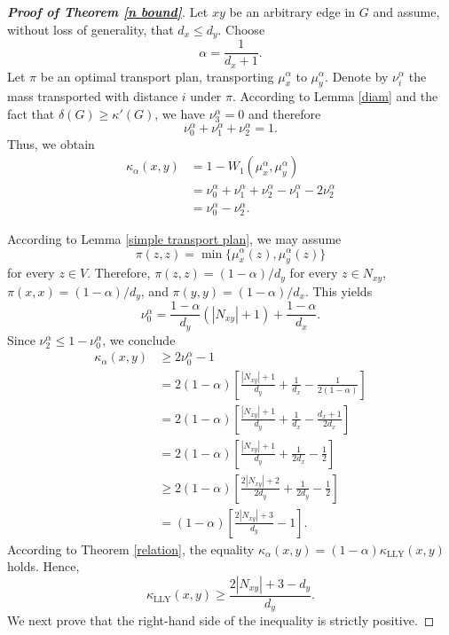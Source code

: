 \documentclass[11pt,bezier]{article}
\theoremstyle{definition}
\theoremstyle{definition}
\theoremstyle{nonumber}
\newtheorem*{theorem*}{Theorem}
\begin{document}

\begin{proof}[\bf{Proof of Theorem \ref{n bound}}]
Let $xy$ be an arbitrary edge in $G$ and assume, without loss of generality, that $d_x \leq d_y$. Choose
$$\alpha = \frac{1}{d_x + 1}.$$
Let $\pi$ be an optimal transport plan, transporting $\mu_x^\alpha$ to $\mu_y^\alpha$. Denote by $\nu_i^\alpha$ the mass transported with distance $i$ under $\pi$. According to Lemma \ref{diam} and the fact that $\delta(G)\geq \kappa'(G)$, we have $\nu_3^\alpha = 0$ and therefore
$$
\nu_0^\alpha + \nu_1^\alpha + \nu_2^\alpha = 1.
$$
Thus, we obtain
\begin{align*} 
\kappa_\alpha(x, y) &= 1 - W_1(\mu_x^\alpha, \mu_y^\alpha)\\
&= \nu_0^\alpha + \nu_1^\alpha + \nu_2^\alpha - \nu_1^\alpha - 2\nu_2^\alpha\\
&= \nu_0^\alpha - \nu_2^\alpha.
\end{align*}

According to Lemma \ref{simple transport plan}, we may assume
$$
\pi(z, z) = \min\{\mu_x^\alpha(z), \mu_y^\alpha(z)\}
$$
for every $z \in V$. Therefore, $\pi(z, z) = (1 - \alpha)/d_y$ for every $z \in N_{xy}$, $\pi(x, x) = (1 - \alpha)/d_y$, and $\pi(y, y) = (1 - \alpha)/d_x$. This yields
$$\nu_0^\alpha = \frac{1 - \alpha}{d_y} (|N_{xy}| + 1) + \frac{1 - \alpha}{d_x}.$$
Since $\nu_2^\alpha \leq 1 - \nu_0^\alpha$, we conclude
\begin{align*} 
\kappa_\alpha(x, y) &\geq 2\nu_0^\alpha - 1\\
&= 2(1 - \alpha) \left[ \frac{|N_{xy}| + 1}{d_y} + \frac{1}{d_x} - \frac{1}{2(1 - \alpha)} \right]\\
&= 2(1 - \alpha) \left[ \frac{|N_{xy}| + 1}{d_y} + \frac{1}{d_x} - \frac{d_x + 1}{2d_x} \right]\\
&= 2(1 - \alpha) \left[ \frac{|N_{xy}| + 1}{d_y} + \frac{1}{2d_x} - \frac{1}{2} \right]\\
&\geq 2(1 - \alpha) \left[ \frac{2|N_{xy}| + 2}{2d_y} + \frac{1}{2d_y} - \frac{1}{2} \right]\\
&= (1 - \alpha) \left[ \frac{2|N_{xy}| + 3}{d_y} - 1 \right].
\end{align*}
According to Theorem \ref{relation}, the equality $\kappa_\alpha(x, y) = (1-\alpha)\kappa_{\mathrm{LLY}}(x, y)$ holds. Hence, 
$$
\kappa_{\mathrm{LLY}}(x, y) \geq \frac{2|N_{xy}| + 3-d_y}{d_y}.
$$
We next prove that the right-hand side of the inequality is strictly positive.


\end{proof}
\end{document}
